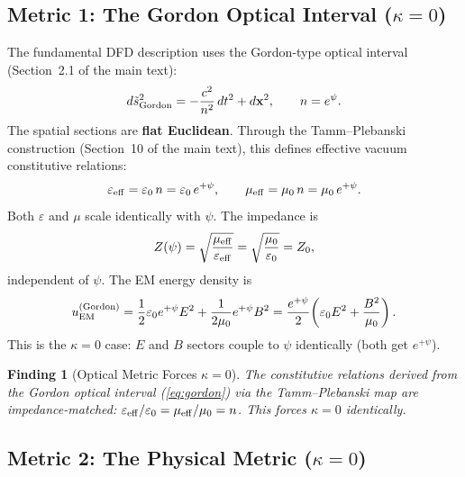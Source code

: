 \documentclass[11pt,a4paper]{article}
\newtheorem{finding}{Finding}
\theoremstyle{definition}
\theoremstyle{remark}
\begin{document}
\subsection{Metric 1: The Gordon Optical Interval ($\kappa = 0$)}

The fundamental DFD description uses the Gordon-type optical interval
(Section~2.1 of the main text):
\begin{equation}\label{eq:gordon}
d\tilde{s}^2_{\rm Gordon} = -\frac{c^2}{n^2}\,dt^2 + d\mathbf{x}^2,
\qquad n = e^\psi.
\end{equation}
The spatial sections are \textbf{flat Euclidean}.  Through the Tamm--Plebanski
construction (Section~10 of the main text), this defines effective vacuum
constitutive relations:
\begin{equation}\label{eq:tamm}
\varepsilon_{\rm eff} = \varepsilon_0\, n = \varepsilon_0\, e^{+\psi},
\qquad
\mu_{\rm eff} = \mu_0\, n = \mu_0\, e^{+\psi}.
\end{equation}
Both $\varepsilon$ and $\mu$ scale identically with $\psi$.  The impedance is
\begin{equation}
Z(\psi) = \sqrt{\frac{\mu_{\rm eff}}{\varepsilon_{\rm eff}}}
= \sqrt{\frac{\mu_0}{\varepsilon_0}} = Z_0,
\end{equation}
independent of $\psi$.  The EM energy density is
\begin{equation}\label{eq:uEM-gordon}
u_{\rm EM}^{\rm (Gordon)} = \frac{1}{2}\varepsilon_0 e^{+\psi} E^2
+ \frac{1}{2\mu_0} e^{+\psi} B^2
= \frac{e^{+\psi}}{2}\!\left(\varepsilon_0 E^2 + \frac{B^2}{\mu_0}\right).
\end{equation}
This is the $\kappa = 0$ case: $E$ and $B$ sectors couple to $\psi$
identically (both get $e^{+\psi}$).

\begin{finding}[Optical Metric Forces $\kappa = 0$]
The constitutive relations derived from the Gordon optical interval
(\ref{eq:gordon}) via the Tamm--Plebanski map are impedance-matched:
$\varepsilon_{\rm eff}/\varepsilon_0 = \mu_{\rm eff}/\mu_0 = n$.
This forces $\kappa = 0$ identically.
\end{finding}

\subsection{Metric 2: The Physical Metric ($\kappa = 0$)}
\end{document}
